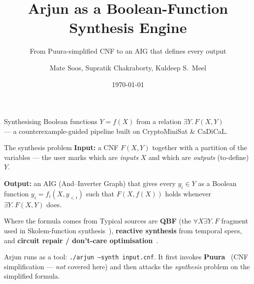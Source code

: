 \documentclass[aspectratio=169]{beamer}
\title[Arjun as a Synthesis Engine]{Arjun as a Boolean-Function Synthesis Engine}
\subtitle{From Puura-simplified CNF to an AIG that defines every output}
\author{Mate Soos, Supratik Chakraborty, Kuldeep S.\ Meel}
\date{\today}
\begin{document}
\begin{frame}[plain]
  \titlepage
  \begin{center}\scriptsize
  Synthesising Boolean functions $Y = f(X)$ from a relation
  $\exists Y.\, F(X,Y)$ \\
  --- a counterexample-guided pipeline built on CryptoMiniSat \& CaDiCaL.
  \end{center}
\end{frame}

\begin{frame}{The synthesis problem}
  \textbf{Input:} a CNF $F(X, Y)$ together with a partition of the
  variables --- the user marks which are \emph{inputs} $X$ and which are
  \emph{outputs} (to-define) $Y$.
  \medskip

  \textbf{Output:} an \alert{AIG} (And--Inverter Graph) that gives every
  $y_i \in Y$ as a Boolean function $y_i = f_i(X, y_{<i})$ such that
  $F(X, f(X))$ holds whenever $\exists Y.\, F(X,Y)$ does.
  \medskip

  \begin{block}{Where the formula comes from}
  Typical sources are \textbf{QBF} (the $\forall X \exists Y.\, F$ fragment used
  in Skolem-function synthesis~\cite{niemetz2012b}), \textbf{reactive
  synthesis} from temporal specs, and \textbf{circuit repair / don't-care
  optimisation}~\cite{john2015efficient}.
  \end{block}
  \medskip

  Arjun runs as a tool: \texttt{./arjun --synth input.cnf}. It first
  invokes \textbf{Puura}~\cite{korhonen2021integrating, soos2019bird}
  (CNF simplification --- \emph{not} covered here) and then attacks the
  \emph{synthesis} problem on the simplified formula.
\end{frame}
\end{document}

